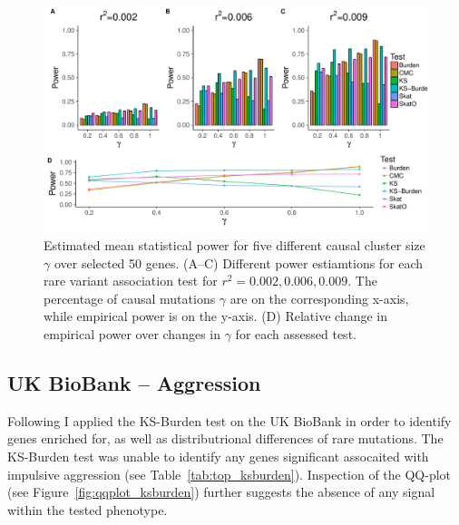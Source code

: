 \begin{figure}[ht!]
  \centering
  \includegraphics[width=1.0\linewidth]{ksburden/figures/combined_power_analysis.pdf}
  \caption[Estimated mean statistical power]{Estimated mean statistical power for five different causal cluster size $\gamma$ over selected 50 genes.
    (A--C) Different power estiamtions for each rare variant association test for $r^2=0.002, 0.006, 0.009$.
    The percentage of causal mutations $\gamma$ are on the corresponding x-axis, while empirical power is on the y-axis.
    (D) Relative change in empirical power over changes in $\gamma$ for each assessed test.\label{fig:simulatedGeneRealData}}
\end{figure}


\subsection{UK BioBank -- Aggression}
\label{sub:ukbiobank_aggression}

Following I applied the KS-Burden test on the UK BioBank in order to identify genes enriched for, as well as distributrional differences of rare mutations. 
The KS-Burden test was unable to identify any genes significant assocaited with impulsive aggression (see Table~\ref{tab:top_ksburden}).
Inspection of the QQ-plot (see Figure~\ref{fig:qqplot_ksburden}) further suggests the absence of any signal within the tested phenotype.

